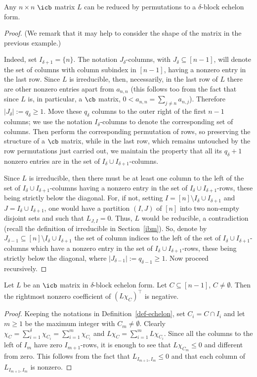 \begin{remark}\label{echelon-reduction}
Any $n\times n$ $\icb$ matrix $L$ can be reduced by permutations to a
$\delta$-block echelon form.
\end{remark}
\begin{proof} (We remark that it may help to consider 
the shape of the matrix in the previous example.)

Indeed, set $I_{\delta+1}=\{n\}$. The notation $J_\delta$-columns,
with $J_{\delta}\subseteq [n-1]$, will denote the set of columns with
column subindex in $[n-1]$, having a nonzero entry in the last
row. Since $L$ is irreducible, then, necessarily, in the last row of
$L$ there are other nonzero entries apart from $a_{n,n}$ (this follows
too from the fact that since $L$ is, in particular, a $\cb$ matrix,
$0<a_{n,n}=\sum_{j\neq n}a_{n,j}$). Therefore $\lvert
J_\delta\rvert:=q_\delta\geq 1$. Move these $q_\delta$ columns to the
outer right of the first $n-1$ columns; we use the notation
$I_\delta$-columns to denote the corresponding set of columns. Then
perform the corresponding permutation of rows, so preserving the
structure of a $\cb$ matrix, while in the last row, which remains
untouched by the row permutations just carried out, we maintain the
property that all its $q_\delta+1$ nonzero entries are in the set of
$I_\delta\cup I_{\delta+1}$-columns.

Since $L$ is irreducible, then there must be at least one column to
the left of the set of $I_\delta\cup I_{\delta+1}$-columns having a
nonzero entry in the set of $I_\delta\cup I_{\delta+1}$-rows, these
being strictly below the diagonal. For, if not, setting
$I=[n]\setminus I_\delta\cup I_{\delta+1}$ and $J=I_\delta\cup
I_{\delta+1}$, one would have a partition $(I,J)$ of $[n]$ into two
non-empty disjoint sets and such that $L_{J,I}=0$. Thus, $L$ would be
reducible, a contradiction (recall the definition of irreducible in
Section~\ref{ibm}). So, denote by $J_{\delta-1}\subseteq [n]\setminus
I_{\delta}\cup I_{\delta+1}$ the set of column indices to the left of
the set of $I_\delta\cup I_{\delta+1}$-columns which have a nonzero
entry in the set of $I_\delta\cup I_{\delta+1}$-rows, these being
strictly below the diagonal, where $\lvert
J_{\delta-1}\rvert:=q_{\delta-1}\geq 1$. Now proceed recursively.
\end{proof}

\begin{remark}\label{rightmost}
Let $L$ be an $\icb$ matrix in $\delta$-block echelon form. Let
$C\subseteq [n-1]$, $C\neq \emptyset$. Then the rightmost nonzero
coefficient of $(L\chi_C)^{\top}$ is negative.
\end{remark}
\begin{proof}
Keeping the notations in Definition~\ref{def-echelon}, set $C_i=C\cap
I_i$ and let $m\geq 1$ be the maximum integer with $C_m\neq
\emptyset$. Clearly
$\chi_C=\sum_{i=1}^{\delta}\chi_{C_i}=\sum_{i=1}^m\chi_{C_i}$ and
$L\chi_C=\sum_{i=1}^mL\chi_{C_i}$. Since all the columns to the left
of $I_m$ have zero $I_{m+1}$-rows, it is enough to see that
$L\chi_{C_m}\leq 0$ and different from zero. This follows from the
fact that $L_{I_{m+1},I_m}\leq 0$ and that each column of
$L_{I_{m+1},I_m}$ is nonzero.
\end{proof}

